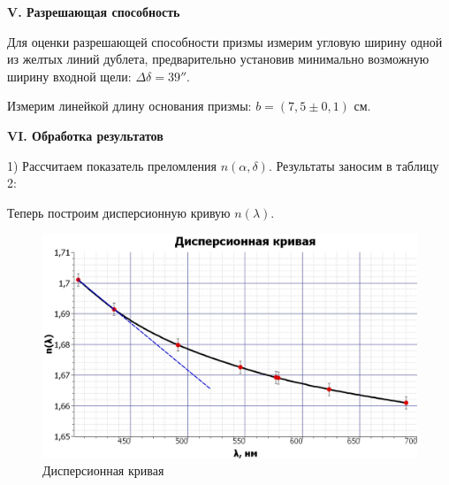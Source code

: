 \documentclass[a4paper,12pt]{article} %
\begin{document}
	
	\begin{center}
		\textbf{V. Разрешающая способность}
	\end{center}

	Для оценки разрешающей способности призмы измерим угловую ширину одной из желтых линий дублета, предварительно установив минимально возможную ширину входной щели: $\Delta \delta = 39''$. 
	
	Измерим линейкой длину основания призмы: $b = (7,5 \pm 0,1)$ см.
	
	
	\begin{center}
		\textbf{VI. Обработка результатов}
	\end{center}

	1) Рассчитаем показатель преломления $n(\alpha, \delta)$. Результаты заносим в таблицу 2:
	
	\begin{table}[h!]
		\centering
	\caption{Зависимость $n(\delta)$, или $n(\lambda)$}
	\end{table}

	Теперь построим дисперсионную кривую $n(\lambda)$.
	\begin{figure}[h!]
		\centering
		\includegraphics[scale=0.55]{Pictures/Кривая}
		\caption{Дисперсионная кривая}
	\end{figure}
	
\end{document}
